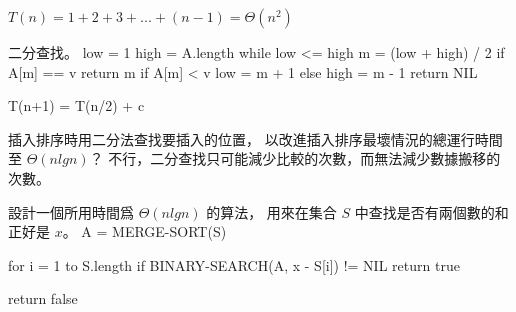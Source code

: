 $T(n) = 1 + 2 + 3 + ... + (n-1) = \Theta(n^2)$
\stopANSWER

二分查找。
\stopEXERCISE
\startANSWER
{}
\startCLRS
low = 1
high = A.length
while low <= high
	m = (low + high) / 2
	if A[m] == v
		return m
	if A[m] < v
		low = m + 1
	else
		high = m - 1
return NIL
\stopCLRS

\startformula
T(n+1) = T(n/2) + c
\stopformula
\stopANSWER

\startEXERCISE
插入排序時用二分法查找要插入的位置，
以改進插入排序最壞情況的總運行時間至 $\Theta(nlgn)$？
\stopEXERCISE
\startANSWER
不行，二分查找只可能減少比較的次數，而無法減少數據搬移的次數。
\stopANSWER

\startEXERCISE
設計一個所用時間爲 $\Theta(nlgn)$ 的算法，
用來在集合 $S$ 中查找是否有兩個數的和正好是 $x$。
\stopEXERCISE
\startANSWER
{}
\startCLRS
A = MERGE-SORT(S)

for i = 1 to S.length
	if BINARY-SEARCH(A, x - S[i]) != NIL
		return true

return false
\stopCLRS
\stopANSWER

\stopsection
